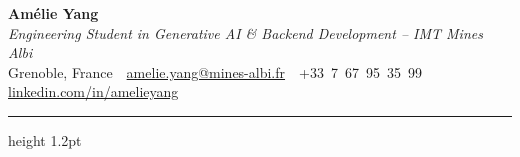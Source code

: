 \documentclass[10.5pt,a4paper]{article}
\begin{document}
\begin{center}
  {\fontsize{26}{30}\selectfont\bfseries Amélie Yang}\\[4pt]
  {\color{accent}\itshape\large Engineering Student in Generative AI \& Backend Development -- IMT Mines Albi}\\[6pt]
  {\small
    Grenoble, France
    \,\textbullet\,
    \href{mailto:amelie.yang@mines-albi.fr}{amelie.yang@mines-albi.fr}
    \,\textbullet\,
    +33~7~67~95~35~99
    \,\textbullet\,
    \href{https://www.linkedin.com/in/amelieyang}{linkedin.com/in/amelieyang}
  }
\end{center}

\vspace{3pt}
{\color{accent}\hrule height 1.2pt}
\vspace{4pt}
\end{document}
